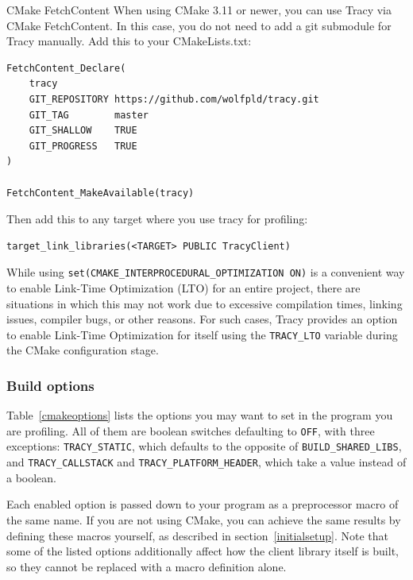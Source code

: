 \documentclass[hidelinks,titlepage,a4paper,twoside]{article}
\begin{document}
\begin{bclogo}[
noborder=true,
couleur=black!5,
logo=\bclampe
]{CMake FetchContent}
When using CMake 3.11 or newer, you can use Tracy via CMake FetchContent. In this case, you do not need to add a git submodule for Tracy manually. Add this to your CMakeLists.txt:

\begin{lstlisting}
FetchContent_Declare(
    tracy
    GIT_REPOSITORY https://github.com/wolfpld/tracy.git
    GIT_TAG        master
    GIT_SHALLOW    TRUE
    GIT_PROGRESS   TRUE
)

FetchContent_MakeAvailable(tracy)
\end{lstlisting}

Then add this to any target where you use tracy for profiling:

\begin{lstlisting}
target_link_libraries(<TARGET> PUBLIC TracyClient)
\end{lstlisting}
\end{bclogo}

While using \texttt{set(CMAKE\_INTERPROCEDURAL\_OPTIMIZATION ON)} is a convenient way to enable Link-Time Optimization (LTO) for an entire project, there are situations in which this may not work due to excessive compilation times, linking issues, compiler bugs, or other reasons.
For such cases, Tracy provides an option to enable Link-Time Optimization for itself using the \texttt{TRACY\_LTO} variable during the CMake configuration stage.

\subsubsection{Build options}
\label{buildoptions}

Table~\ref{cmakeoptions} lists the options you may want to set in the program you are profiling. All of them are boolean switches defaulting to \texttt{OFF}, with three exceptions: \texttt{TRACY\_STATIC}, which defaults to the opposite of \texttt{BUILD\_SHARED\_LIBS}, and \texttt{TRACY\_CALLSTACK} and \texttt{TRACY\_PLATFORM\_HEADER}, which take a value instead of a boolean.

Each enabled option is passed down to your program as a preprocessor macro of the same name. If you are not using CMake, you can achieve the same results by defining these macros yourself, as described in section~\ref{initialsetup}. Note that some of the listed options additionally affect how the client library itself is built, so they cannot be replaced with a macro definition alone.
\end{document}
